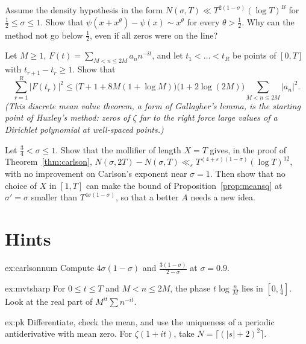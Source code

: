 \begin{exercise}[$\star\star$]\label{ex:dh}
Assume the density hypothesis in the form $N(\sigma,T)\ll T^{2(1-\sigma)}(\log T)^B$ for $\frac12\le\sigma\le1$. Show that $\psi(x+x^\theta)-\psi(x)\sim x^\theta$ for every $\theta>\frac12$. Why can the method not go below $\frac12$, even if all zeros were on the line?
\end{exercise}

\begin{exercise}[$\star\star$]\label{ex:discrete}
Let $M\ge1$, $F(t)=\sum_{M<n\le2M}a_nn^{-it}$, and let $t_1<\dots<t_R$ be points of $[0,T]$ with $t_{r+1}-t_r\ge1$. Show that
\[
\sum_{r=1}^R|F(t_r)|^2\le\bigl(T+1+8M(1+\log M)\bigr)\bigl(1+2\log(2M)\bigr)\sum_{M<n\le2M}|a_n|^2.
\]
\emph{(This discrete mean value theorem, a form of Gallagher's lemma, is the starting point of Huxley's method: zeros of $\zeta$ far to the right force large values of a Dirichlet polynomial at well-spaced points.)}
\end{exercise}

\begin{exercise}[$\star\star\star$]\label{ex:density1}
Let $\frac34<\sigma\le1$. Show that the mollifier of length $X=T$ gives, in the proof of Theorem~\ref{thm:carlson}, $N(\sigma,2T)-N(\sigma,T)\ll_\varepsilon T^{(4+\varepsilon)(1-\sigma)}(\log T)^{12}$, with no improvement on Carlson's exponent near $\sigma=1$. Then show that no choice of $X$ in $[1,T]$ can make the bound of Proposition~\ref{prop:meansq} at $\sigma'=\sigma$ smaller than $T^{4\sigma(1-\sigma)}$, so that a better $A$ needs a new idea.
\end{exercise}

\section{Hints}

\begin{hint}{ex:carlsonnum}
Compute $4\sigma(1-\sigma)$ and $\frac{3(1-\sigma)}{2-\sigma}$ at $\sigma=0.9$.
\end{hint}

\begin{hint}{ex:mvtsharp}
For $0\le t\le T$ and $M<n\le2M$, the phase $t\log\frac nM$ lies in $[0,\frac14]$. Look at the real part of $M^{it}\sum n^{-it}$.
\end{hint}

\begin{hint}{ex:pk}
Differentiate, check the mean, and use the uniqueness of a periodic antiderivative with mean zero. For $\zeta(1+it)$, take $N=\lceil(|s|+2)^2\rceil$.
\end{hint}

